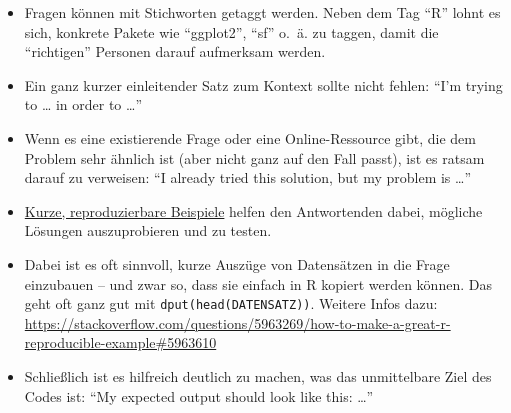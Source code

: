 \documentclass[11pt,german,a4paper]{article}
\providecommand{\tightlist}{%
  \setlength{\itemsep}{0pt}\setlength{\parskip}{0pt}}
\begin{document}
\begin{itemize}
\tightlist
\item
  Fragen können mit Stichworten getaggt werden. Neben dem Tag ``R'' lohnt es sich, konkrete Pakete wie ``ggplot2'', ``sf'' o.~ä. zu taggen, damit die ``richtigen'' Personen darauf aufmerksam werden.
\item
  Ein ganz kurzer einleitender Satz zum Kontext sollte nicht fehlen: ``I'm trying to \ldots{} in order to \ldots{}''
\item
  Wenn es eine existierende Frage oder eine Online-Ressource gibt, die dem Problem sehr ähnlich ist (aber nicht ganz auf den Fall passt), ist es ratsam darauf zu verweisen: ``I already tried this solution, but my problem is \ldots{}''
\item
  \href{https://en.wikipedia.org/wiki/Minimal_working_example}{Kurze, reproduzierbare Beispiele} helfen den Antwortenden dabei, mögliche Lösungen auszuprobieren und zu testen.
\item
  Dabei ist es oft sinnvoll, kurze Auszüge von Datensätzen in die Frage einzubauen -- und zwar so, dass sie einfach in R kopiert werden können. Das geht oft ganz gut mit \texttt{dput(head(DATENSATZ))}. Weitere Infos dazu: \url{https://stackoverflow.com/questions/5963269/how-to-make-a-great-r-reproducible-example\#5963610}
\item
  Schließlich ist es hilfreich deutlich zu machen, was das unmittelbare Ziel des Codes ist: ``My expected output should look like this: \ldots{}''
\end{itemize}
\end{document}
